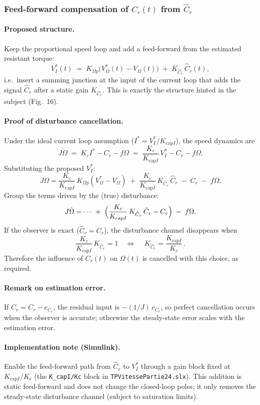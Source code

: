 \documentclass{rapportCS}
\begin{document}
\subsubsection{Feed-forward compensation of $C_r(t)$ from $\hat C_r$}

\paragraph{Proposed structure.}
Keep the proportional speed loop and add a feed-forward from the estimated resistant torque:
\[
V_I^\ast(t)\;=\;K_{\Omega p}\bigl(V_\Omega^\ast(t)-V_\Omega(t)\bigr)\;+\;K_{\hat C_r}\,\hat C_r(t),
\]
i.e.\ insert a summing junction at the input of the current loop that adds the signal
$\hat C_r$ after a static gain $K_{\hat C_r}$. This is exactly the structure hinted in the subject (Fig.~16). \,

\paragraph{Proof of disturbance cancellation.}
Under the ideal current loop assumption ($I^\ast = V_I^\ast/K_{\text{cap}I}$), the speed dynamics are
\[
J\dot\Omega \;=\; K_c I^\ast - C_r - f\Omega
\;=\; \frac{K_c}{K_{\text{cap}I}}\,V_I^\ast - C_r - f\Omega .
\]
Substituting the proposed $V_I^\ast$:
\[
J\dot\Omega = \frac{K_c}{K_{\text{cap}I}}\,K_{\Omega p}(V_\Omega^\ast - V_\Omega)
\;+\;\frac{K_c}{K_{\text{cap}I}}\,K_{\hat C_r}\,\hat C_r
\;-\; C_r \;-\; f\Omega .
\]
Group the terms driven by the (true) disturbance:
\[
J\dot\Omega = \cdots \;+\;\Bigl(\frac{K_c}{K_{\text{cap}I}}\,K_{\hat C_r}\,\hat C_r - C_r\Bigr) \;-\; f\Omega .
\]
If the observer is exact ($\hat C_r = C_r$), the disturbance channel disappears when
\[
\frac{K_c}{K_{\text{cap}I}}\,K_{\hat C_r} = 1 
\quad \Longleftrightarrow \quad
\boxed{\,K_{\hat C_r} = \dfrac{K_{\text{cap}I}}{K_c}\,}.
\]
Therefore the influence of $C_r(t)$ on $\Omega(t)$ is cancelled with this choice, as required. \,

\paragraph{Remark on estimation error.}
If $\hat C_r = C_r - e_{C_r}$, the residual input is $-(1/J)\,e_{C_r}$, so perfect cancellation occurs when the observer is accurate; otherwise the steady-state error scales with the estimation error.

\paragraph{Implementation note (Simulink).}
Enable the feed-forward path from $\hat C_r$ to $V_I^\ast$ through a gain block fixed at
$K_{\text{cap}I}/K_c$ (the \texttt{K\_capI/Kc} block in \texttt{TPVitessePartie24.slx}). This addition is static feed-forward and does not change the closed-loop poles; it only removes the steady-state disturbance channel (subject to saturation limits). \,
\end{document}
